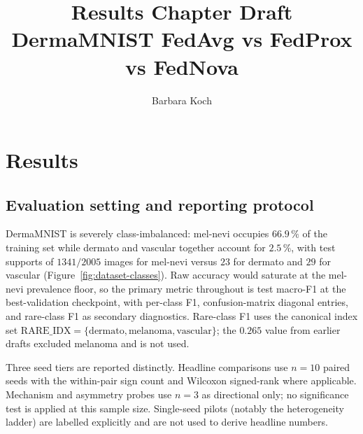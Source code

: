 \documentclass[11pt,a4paper]{report}
\title{Results Chapter Draft\\
\large DermaMNIST FedAvg vs FedProx vs FedNova}
\author{Barbara Koch}
\date{}
\begin{document}
\maketitle

\setcounter{chapter}{4}
\chapter{Results}
\label{ch:results}






\section{Evaluation setting and reporting protocol}
\label{sec:eval-setting}

DermaMNIST is severely class-imbalanced: mel-nevi occupies $66.9\,\%$ of
the training set while dermato and vascular together account for $2.5\,\%$,
with test supports of $1341/2005$ images for mel-nevi versus $23$ for
dermato and $29$ for vascular (Figure~\ref{fig:dataset-classes}). Raw
accuracy would saturate at the mel-nevi prevalence floor, so the primary
metric throughout is test macro-F1 at the best-validation checkpoint, with
per-class F1, confusion-matrix diagonal entries, and rare-class F1 as
secondary diagnostics. Rare-class F1 uses the canonical index set
$\mathrm{RARE\_IDX} = \{\text{dermato}, \text{melanoma}, \text{vascular}\}$;
the $0.265$ value from earlier drafts excluded melanoma and is not used.

Three seed tiers are reported distinctly. Headline comparisons use $n = 10$
paired seeds with the within-pair sign count and Wilcoxon signed-rank where
applicable. Mechanism and asymmetry probes use $n = 3$ as directional only;
no significance test is applied at this sample size. Single-seed pilots
(notably the heterogeneity ladder) are labelled explicitly and are not used
to derive headline numbers.
\end{document}

